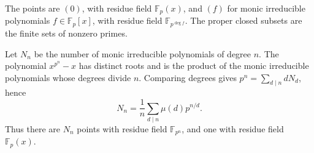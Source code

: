 The points are $(0)$, with residue field $\mathbb F_p(x)$, and $(f)$ for monic irreducible polynomials $f\in\mathbb F_p[x]$, with residue field $\mathbb F_{p^{\deg f}}$. The proper closed subsets are the finite sets of nonzero primes.

Let $N_n$ be the number of monic irreducible polynomials of degree $n$. The polynomial $x^{p^n}-x$ has distinct roots and is the product of the monic irreducible polynomials whose degrees divide $n$. Comparing degrees gives $p^n=\sum_{d\mid n}dN_d$, hence
\[N_n=\frac1n\sum_{d\mid n}\mu(d)p^{n/d}.\]
Thus there are $N_n$ points with residue field $\mathbb F_{p^n}$, and one with residue field $\mathbb F_p(x)$.
